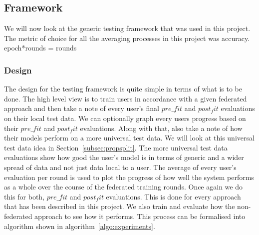 \documentclass[12pt]{article}
\begin{document}
\subsection{Framework}
We will now look at the generic testing framework that was used in this project. The metric of choice for all the averaging processes in this project was accuracy. 
epoch*rounds = rounds

\subsubsection{Design}
The design for the testing framework is quite simple in terms of what is to be done. The high level view is to train users in accordance with a given federated approach and then take a note of every user's final $pre\_fit$ and $post_fit$ evaluations on their local test data. We can optionally graph every users progress based on their $pre\_fit$ and $post_fit$ evaluations. Along with that, also take a note of how their models perform on a more universal test data. We will look at this universal test data idea in Section~\ref{subsec:propsplit}. The more universal test data evaluations show how good the user's model is in terms of generic and a wider spread of data and not just data local to a user. The average of every user's evaluation per round is used to plot the progress of how well the system performs as a whole over the course of the federated training rounds. Once again we do this for both, $pre\_fit$ and $post_fit$ evaluations. This is done for every approach that has been described in this project. We also train and evaluate how the non-federated approach to see how it performs. This process can be formalised into algorithm shown in algorithm~\ref{algo:experiments}.
\end{document}
